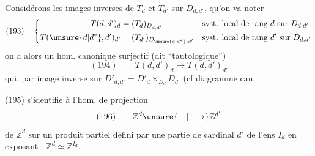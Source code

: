 Considérons les images inverses de $T_d$ et $T_{d'}$ sur $D_{d,d'}$, qu'on va noter
\[
(193)\quad\left\{\begin{aligned}
T(d,d')_d&=(T_d)_{D_{d,d'}}&&\text{syst. local de rang }d\text{ sur }D_{d,d'}\\
T(\unsure{d|d^*},d')_{d'}&=(T_{d'})_{D_{\unsure{d|d^*},d'}}&&\text{syst. local de rang }d'\text{ sur }D_{d,d'}
\end{aligned}\right.
\]
on a alors un hom. canonique surjectif (dit ``tautologique'')
\[
(194)\qquad T(d,d')_d\longrightarrow T(d,d')_{d'}
\]
qui, par image inverse sur $D'_{d,d'}=D'_d\mathbin\times_{D_d}D_{d'}$ (cf diagramme can.

(195)\quad
{}
s'identifie à l'hom. de projection
\[
(196)\qquad\mathbb Z^d\unsure{\text{---}|\longrightarrow}\mathbb Z^{d'}
\]
de $\mathbb Z^d$ sur un produit partiel défini par une partie de cardinal $d'$ de l'ens $I_d$ en exposant : $\mathbb Z^d\simeq\mathbb Z^{I_d}$.
